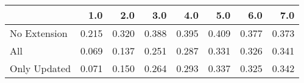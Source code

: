 \begin{tabular}{lrrrrrrr}
\toprule
{} &   1.0 &   2.0 &   3.0 &   4.0 &   5.0 &   6.0 &   7.0 \\
\midrule
No Extension & 0.215 & 0.320 & 0.388 & 0.395 & 0.409 & 0.377 & 0.373 \\
All          & 0.069 & 0.137 & 0.251 & 0.287 & 0.331 & 0.326 & 0.341 \\
Only Updated & 0.071 & 0.150 & 0.264 & 0.293 & 0.337 & 0.325 & 0.342 \\
\bottomrule
\end{tabular}
